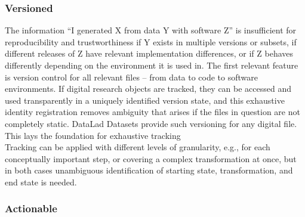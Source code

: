 \subsubsection{Versioned}

The information ``I generated X from data Y with software Z'' is insufficient for reproducibility and trustworthiness if Y exists in multiple versions or subsets, if different releases of Z have relevant implementation differences, or if Z behaves differently depending on the environment it is used in.
The first relevant feature is version control for all relevant files -- from data to code to software environments.
If digital research objects are tracked, they can be accessed and used transparently in a uniquely identified version state, and this exhaustive identity registration removes ambiguity that arises if the files in question are not completely static.
DataLad Datasets provide such versioning for any digital file.
This lays the foundation for exhaustive tracking \\



Tracking can be applied with different levels of granularity, e.g., for each conceptually important step, or covering a complex transformation at once, but in both cases unambiguous identification of starting state, transformation, and end state is needed.

\subsubsection{Actionable}


